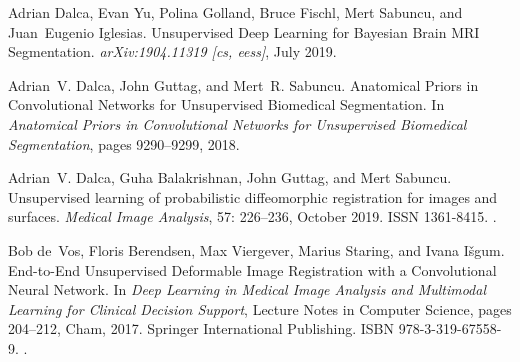 \documentclass{midl}
\begin{document}
\begin{thebibliography}{50}
Adrian Dalca, Evan Yu, Polina Golland, Bruce Fischl, Mert Sabuncu, and
  Juan~Eugenio Iglesias.
\newblock Unsupervised {Deep} {Learning} for {Bayesian} {Brain} {MRI}
  {Segmentation}.
\newblock \emph{arXiv:1904.11319 [cs, eess]}, July 2019{}.

Adrian~V. Dalca, John Guttag, and Mert~R. Sabuncu.
\newblock Anatomical {Priors} in {Convolutional} {Networks} for {Unsupervised}
  {Biomedical} {Segmentation}.
\newblock In \emph{Anatomical {Priors} in {Convolutional} {Networks} for
  {Unsupervised} {Biomedical} {Segmentation}}, pages 9290--9299, 2018.

Adrian~V. Dalca, Guha Balakrishnan, John Guttag, and Mert Sabuncu.
\newblock Unsupervised learning of probabilistic diffeomorphic registration for
  images and surfaces.
\newblock \emph{Medical Image Analysis}, 57: 226--236, October
  2019{}.
\newblock ISSN 1361-8415.
\newblock {}.

Bob de~Vos, Floris Berendsen, Max Viergever, Marius Staring, and Ivana Išgum.
\newblock End-to-{End} {Unsupervised} {Deformable} {Image} {Registration} with
  a {Convolutional} {Neural} {Network}.
\newblock In \emph{Deep {Learning} in {Medical} {Image} {Analysis} and
  {Multimodal} {Learning} for {Clinical} {Decision} {Support}}, Lecture {Notes}
  in {Computer} {Science}, pages 204--212, Cham, 2017. Springer International
  Publishing.
\newblock ISBN 978-3-319-67558-9.
\newblock {}.


\end{thebibliography}
\end{document}
